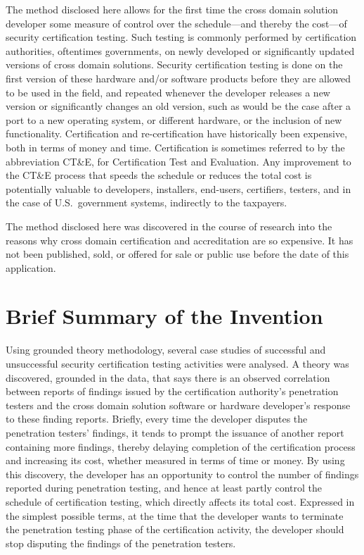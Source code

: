 \documentclass[12pt,letterpaper]{article}
\begin{document}
The method disclosed here allows for the first time the cross domain solution developer some
measure of control over the schedule---and thereby the cost---of security certification testing.
Such testing is commonly performed by certification authorities, oftentimes governments,
on newly developed or significantly updated versions of cross domain solutions.  Security
certification testing is done on the first version of these hardware and/or software
products before they are allowed to be used in the field, and repeated whenever the
developer releases a new version or significantly changes an old version, such as would
be the case after a port to a new operating system, or different hardware, or the inclusion
of new functionality.  Certification and re-certification have historically been expensive,
both in terms of money and time.  Certification is sometimes referred to by the abbreviation
CT\&E, for Certification Test and Evaluation.  Any improvement to the CT\&E process that speeds
the schedule or reduces the total cost is potentially valuable to developers, installers, end-users,
certifiers, testers, and in the case of U.S.\ government systems, indirectly to the taxpayers.

The method disclosed here was discovered in the course of research into the reasons why
cross domain certification and accreditation are so expensive.  It has not been published,
sold, or offered for sale or public use before the date of this application.

\section{Brief Summary of the Invention}

Using grounded theory methodology, several case studies of successful and unsuccessful
security certification testing activities were analysed.  A theory was discovered, grounded
in the data, that says there is an observed correlation between reports of findings issued
by the certification authority's penetration testers and the cross domain solution software
or hardware developer's response to these finding reports.  Briefly, every time the developer
disputes the penetration testers'
findings, it tends to prompt the issuance of another report containing more findings, thereby
delaying completion of the certification process and increasing its cost, whether measured
in terms of time or money.  By using this discovery, the developer has an opportunity to
control the number of findings reported during penetration testing, and
hence at least partly control the schedule of certification testing, which directly affects
its total cost.  Expressed in the simplest possible terms, at the time that the developer wants
to terminate the penetration testing phase of the certification activity, the developer should
stop disputing the findings of the penetration testers.
\end{document}
